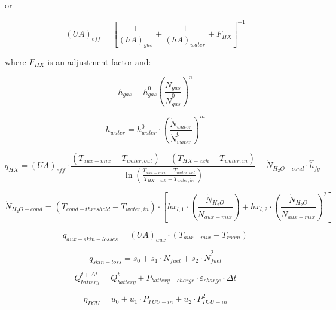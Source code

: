 or

\begin{equation}
{\left( {UA} \right)_{eff}} = {\left[ {\frac{1}{{{{\left( {hA} \right)}_{gas}}}} + \frac{1}{{{{(hA)}_{water}}}} + {F_{HX}}} \right]^{ - 1}}
\end{equation}

where \(F_{HX}\) is an adjustment factor and:

\begin{equation}
h_{gas} = h_{gas}^0 \left( \frac{\dot{N}_{gas}}{\dot{N}_{gas}^0} \right)^n
\end{equation}

\begin{equation}
{h_{water}} = h_{water}^0 \cdot {\left( {\frac{{{{\dot N}_{water}}}}{{\dot N_{water}^0}}} \right)^m}
\end{equation}

\begin{equation}
{q_{HX}} = {\left( {UA} \right)_{eff}} \cdot \frac{{\left( {{T_{aux - mix}} - {T_{water,out}}} \right) - \left( {{T_{HX - exh}} - {T_{water,in}}} \right)}}{{\ln \left( {\frac{{{T_{aux - mix}} - {T_{water,out}}}}{{{T_{HX - exh}} - {T_{water,in}}}}} \right)}} + {\dot N_{{H_2}O - cond}} \cdot {\hat h_{fg}}
\end{equation}

\begin{equation}
{\dot N_{{H_2}O - cond}} = \left( {{T_{cond - threshold}} - {T_{water,in}}} \right) \cdot \left[ {h{x_{l,1}} \cdot \left( {\frac{{{{\dot N}_{{H_2}O}}}}{{{{\dot N}_{aux - mix}}}}} \right) + h{x_{l,2}} \cdot {{\left( {\frac{{{{\dot N}_{{H_2}O}}}}{{{{\dot N}_{aux - mix}}}}} \right)}^2}} \right]
\end{equation}

\begin{equation}
{q_{aux - skin - losses}} = {(UA)_{aux}} \cdot ({T_{aux - mix}} - {T_{room}})
\end{equation}

\begin{equation}
{q_{skin - loss}} = {s_0} + {s_1} \cdot {\dot N_{fuel}} + {s_2} \cdot \dot N_{fuel}^2
\end{equation}

\begin{equation}
Q_{battery}^{t + \Delta t} = Q_{battery}^t + {P_{battery - charge}} \cdot {\varepsilon_{charge}} \cdot \Delta t
\end{equation}

\begin{equation}
{\eta_{PCU}} = {u_0} + {u_1} \cdot {P_{PCU - in}} + {u_2} \cdot P_{PCU - in}^2
\end{equation}

